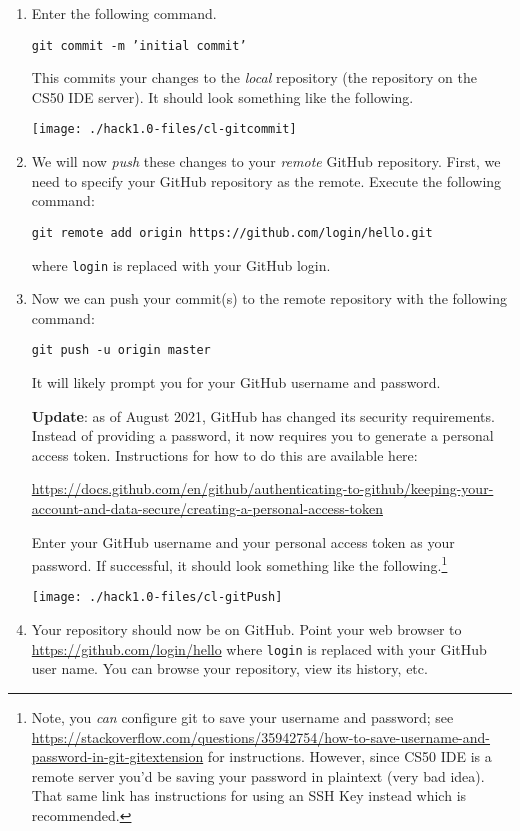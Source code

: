 \documentclass[12pt]{scrartcl}
\begin{document}
\begin{enumerate}
  \item Enter the following command.

  \texttt{git commit -m 'initial commit'}
  
  This commits your changes to the \emph{local} repository
  (the repository on the CS50 IDE server).  It should look something
  like the following.
  
  \begin{center}
  \texttt{[image: ./hack1.0-files/cl-gitcommit]}
  \end{center}

  \item We will now \emph{push} these changes to your \emph{remote}
  GitHub repository.  First, we need to specify your GitHub 
  repository as the remote.  Execute the following command:
  
  \texttt{git remote add origin https://github.com/login/hello.git}
  
  where \texttt{login} is replaced with your GitHub login.
  
  \item Now we can push your commit(s) to the remote repository
  with the following command:
  
  \texttt{git push -u origin master}
  
  It will likely prompt you for your GitHub username and password.

  \textbf{Update}: as of August 2021, GitHub has changed its security
  requirements.  Instead of providing a password, it now requires you
  to generate a personal access token.  Instructions for how to do this
  are available here:
  
  \url{https://docs.github.com/en/github/authenticating-to-github/keeping-your-account-and-data-secure/creating-a-personal-access-token}
  
  Enter your GitHub username and your personal access token as your
  password.  If successful, it should look something like
  the following.\footnote{Note, you \emph{can} configure git 
  to save your username and password; see \url{https://stackoverflow.com/questions/35942754/how-to-save-username-and-password-in-git-gitextension} for
  instructions.  However, since CS50 IDE is a remote server you'd
  be saving your password in plaintext (very bad idea).  That same
  link has instructions for using an SSH Key instead which is
  recommended.}
  
  \begin{center}
  \texttt{[image: ./hack1.0-files/cl-gitPush]}
  \end{center}

  \item Your repository should now be on GitHub.
  Point your web browser to \url{https://github.com/login/hello}
  where \texttt{login} is replaced with your GitHub user
  name.  You can browse your repository, view its history, etc.
  
\end{enumerate}
\end{document}
